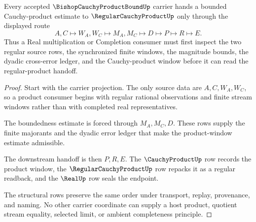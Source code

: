 \begin{theorem}
\label{thm:bishop-cauchy-product-bound-regular-handoff}
Every accepted $\BishopCauchyProductBoundUp$ carrier hands a bounded Cauchy-product estimate to $\RegularCauchyProductUp$ only through the displayed route
$$
A,C\longmapsto W_A,W_C\longmapsto M_A,M_C\longmapsto D\longmapsto P\longmapsto R\longmapsto E .
$$
Thus a Real multiplication or Completion consumer must first inspect the two regular source rows, the synchronized finite windows, the magnitude bounds, the dyadic cross-error ledger, and the Cauchy-product window before it can read the regular-product handoff.
\end{theorem}
\begin{proof}
Start with the carrier projection. The only source data are $A,C,W_A,W_C$, so a product consumer begins with regular rational observations and finite stream windows rather than with completed real representatives.

The boundedness estimate is forced through $M_A,M_C,D$. These rows supply the finite majorants and the dyadic error ledger that make the product-window estimate admissible.

The downstream handoff is then $P,R,E$. The $\CauchyProductUp$ row records the product window, the $\RegularCauchyProductUp$ row repacks it as a regular readback, and the $\RealUp$ row seals the endpoint.

The structural rows preserve the same order under transport, replay, provenance, and naming. No other carrier coordinate can supply a host product, quotient stream equality, selected limit, or ambient completeness principle.
\end{proof}



